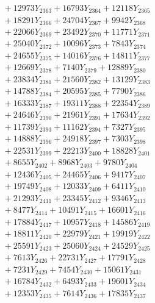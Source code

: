 \documentclass[a4paper,10pt]{article}
\begin{document}
{\begin{align}
&\;  + 12973 Y_{2363} + 16793 Y_{2364} + 12118 Y_{2365} \\[0.3ex]
&\;  + 18291 Y_{2366} + 24704 Y_{2367} + 9942 Y_{2368} \\[0.5ex]\allowbreak
&\;  + 22066 Y_{2369} + 23492 Y_{2370} + 11771 Y_{2371} \\[0.3ex]
&\;  + 25040 Y_{2372} + 10096 Y_{2373} + 7843 Y_{2374} \\[0.3ex]
&\;  + 24655 Y_{2375} + 14016 Y_{2376} + 14811 Y_{2377} \\[0.3ex]
&\;  + 12669 Y_{2378} + 7140 Y_{2379} + 12889 Y_{2380} \\[0.3ex]
&\;  + 23834 Y_{2381} + 21560 Y_{2382} + 13129 Y_{2383} \\[0.3ex]
&\;  + 14788 Y_{2384} + 20595 Y_{2385} + 7790 Y_{2386} \\[0.3ex]
&\;  + 16333 Y_{2387} + 19311 Y_{2388} + 22354 Y_{2389} \\[0.3ex]
&\;  + 24646 Y_{2390} + 21961 Y_{2391} + 17634 Y_{2392} \\[0.3ex]
&\;  + 11739 Y_{2393} + 11162 Y_{2394} + 7327 Y_{2395} \\[0.3ex]
&\;  + 14888 Y_{2396} + 24918 Y_{2397} + 7303 Y_{2398} \\[0.5ex]\allowbreak
&\;  + 22531 Y_{2399} + 22213 Y_{2400} + 18828 Y_{2401} \\[0.3ex]
&\;  + 8655 Y_{2402} + 8968 Y_{2403} + 9780 Y_{2404} \\[0.3ex]
&\;  + 12436 Y_{2405} + 24465 Y_{2406} + 9417 Y_{2407} \\[0.3ex]
&\;  + 19749 Y_{2408} + 12033 Y_{2409} + 6411 Y_{2410} \\[0.3ex]
&\;  + 21293 Y_{2411} + 23345 Y_{2412} + 9346 Y_{2413} \\[0.3ex]
&\;  + 8477 Y_{2414} + 10491 Y_{2415} + 16601 Y_{2416} \\[0.3ex]
&\;  + 17884 Y_{2417} + 10957 Y_{2418} + 14586 Y_{2419} \\[0.3ex]
&\;  + 18811 Y_{2420} + 22979 Y_{2421} + 19919 Y_{2422} \\[0.3ex]
&\;  + 25591 Y_{2423} + 25060 Y_{2424} + 24529 Y_{2425} \\[0.3ex]
&\;  + 7613 Y_{2426} + 22731 Y_{2427} + 17791 Y_{2428} \\[0.5ex]\allowbreak
&\;  + 7231 Y_{2429} + 7454 Y_{2430} + 15061 Y_{2431} \\[0.3ex]
&\;  + 16784 Y_{2432} + 6493 Y_{2433} + 19601 Y_{2434} \\[0.3ex]
&\;  + 12353 Y_{2435} + 7614 Y_{2436} + 17835 Y_{2437} \\[0.3ex]

\end{align}}
\end{document}
